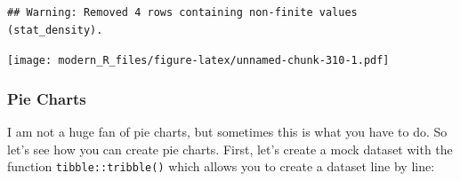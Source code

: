 \documentclass[]{gitbook}
\newenvironment{Shaded}{\begin{snugshade}}{\end{snugshade}}
\newcommand{\DataTypeTok}[1]{\textcolor[rgb]{0.13,0.29,0.53}{#1}}
\newcommand{\DecValTok}[1]{\textcolor[rgb]{0.00,0.00,0.81}{#1}}
\newcommand{\KeywordTok}[1]{\textcolor[rgb]{0.13,0.29,0.53}{\textbf{#1}}}
\newcommand{\NormalTok}[1]{#1}
\newcommand{\OperatorTok}[1]{\textcolor[rgb]{0.81,0.36,0.00}{\textbf{#1}}}
\newcommand{\StringTok}[1]{\textcolor[rgb]{0.31,0.60,0.02}{#1}}
\theoremstyle{definition}
\theoremstyle{definition}
\theoremstyle{definition}
\theoremstyle{remark}
\begin{document}
\begin{Shaded}
\end{Shaded}

\begin{verbatim}
## Warning: Removed 4 rows containing non-finite values (stat_density).
\end{verbatim}

\texttt{[image: modern\_R\_files/figure-latex/unnamed-chunk-310-1.pdf]}

\hypertarget{pie-charts}{%
\subsubsection{Pie Charts}\label{pie-charts}}

I am not a huge fan of pie charts, but sometimes this is what you have
to do. So let's see how you can create pie charts. First, let's create a
mock dataset with the function \texttt{tibble::tribble()} which allows
you to create a dataset line by line:
\end{document}
